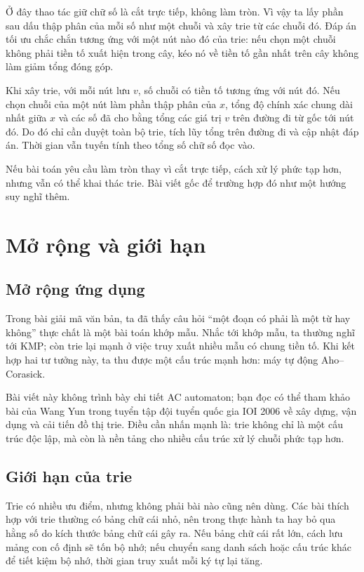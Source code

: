 \documentclass[11pt]{article}
\begin{document}
Ở đây thao tác giữ chữ số là cắt trực tiếp, không làm tròn. Vì vậy ta lấy
phần sau dấu thập phân của mỗi số như một chuỗi và xây trie từ các chuỗi đó.
Đáp án tối ưu chắc chắn tương ứng với một nút nào đó của trie: nếu chọn một
chuỗi không phải tiền tố xuất hiện trong cây, kéo nó về tiền tố gần nhất trên
cây không làm giảm tổng đóng góp.

Khi xây trie, với mỗi nút lưu \(v\), số chuỗi có tiền tố tương ứng với nút đó.
Nếu chọn chuỗi của một nút làm phần thập phân của \(x\), tổng độ chính xác
chung dài nhất giữa \(x\) và các số đã cho bằng tổng các giá trị \(v\) trên
đường đi từ gốc tới nút đó. Do đó chỉ cần duyệt toàn bộ trie, tích lũy tổng
trên đường đi và cập nhật đáp án. Thời gian vẫn tuyến tính theo tổng số chữ
số đọc vào.

Nếu bài toán yêu cầu làm tròn thay vì cắt trực tiếp, cách xử lý phức tạp hơn,
nhưng vẫn có thể khai thác trie. Bài viết gốc để trường hợp đó như một hướng
suy nghĩ thêm.

\section{Mở rộng và giới hạn}

\subsection{Mở rộng ứng dụng}

Trong bài giải mã văn bản, ta đã thấy câu hỏi ``một đoạn có phải là một từ
hay không'' thực chất là một bài toán khớp mẫu. Nhắc tới khớp mẫu, ta thường
nghĩ tới KMP; còn trie lại mạnh ở việc truy xuất nhiều mẫu có chung tiền tố.
Khi kết hợp hai tư tưởng này, ta thu được một cấu trúc mạnh hơn: máy tự động
Aho--Corasick.

Bài viết này không trình bày chi tiết AC automaton; bạn đọc có thể tham khảo
bài của Wang Yun trong tuyển tập đội tuyển quốc gia IOI 2006 về xây dựng,
vận dụng và cải tiến đồ thị trie. Điều cần nhấn mạnh là: trie không chỉ là một
cấu trúc độc lập, mà còn là nền tảng cho nhiều cấu trúc xử lý chuỗi phức tạp
hơn.

\subsection{Giới hạn của trie}

Trie có nhiều ưu điểm, nhưng không phải bài nào cũng nên dùng. Các bài thích
hợp với trie thường có bảng chữ cái nhỏ, nên trong thực hành ta hay bỏ qua
hằng số do kích thước bảng chữ cái gây ra. Nếu bảng chữ cái rất lớn, cách lưu
mảng con cố định sẽ tốn bộ nhớ; nếu chuyển sang danh sách hoặc cấu trúc khác
để tiết kiệm bộ nhớ, thời gian truy xuất mỗi ký tự lại tăng.
\end{document}
